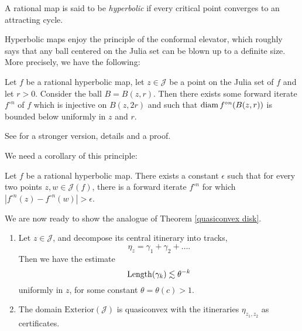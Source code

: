 A rational map is said to be \emph{hyperbolic} if every critical point converges to an attracting cycle.

Hyperbolic maps enjoy the principle of the conformal elevator, which roughly says that any ball centered on the Julia set can be blown up to a definite size. More precisely, we have the following:

\begin{proposition} \label{elevator}
	Let $f$ be a rational hyperbolic map, let $z\in \mathcal J$ be a point on the Julia set of $f$ and let $r>0$. Consider the ball $B=B(z,r)$. Then there exists some forward iterate $f^{\circ n}$ of $f$ which is injective on $B(z,2r)$ and such that
	$\operatorname{diam} {f^{\circ n}(B(z,r))}$ is bounded below uniformly in $z$ and $r$. 
\end{proposition}

See \cite{bonk_quasisymmetries_2016} for a stronger version, details and a proof.

We need a corollary of this principle:

\begin{corollary} \label{elevator for points on julia}
	Let $f$ be a rational hyperbolic map. There exists a constant $\epsilon$ such that for every two points $z,w\in\mathcal{J}(f)$, there is a forward iterate
$f^{\circ n}$ for which $\left|f^{\circ n}(z)-f^{\circ n}(w)\right|>\epsilon$.	
\end{corollary}

\begin{comment}
\begin{proof}
	Apply proposition \ref{elevator} to a ball centered on the Julia set which contains $z,w$ on its boundary at roughly antipodal points. After blowing up we get points $f^{\circ n}(z),f^{\circ n}(w)$ which are a definite distance apart by Koebe's distortion theorem. %
\end{proof}
\end{comment}

We are now ready to show the analogue of Theorem \ref{quasiconvex disk}.
\begin{theorem} 
\begin{enumerate}[label=(\roman*)]

\item Let $z\in\mathcal{J}$, and decompose its central itinerary into tracks, 
\begin{equation*}
\eta_z = \gamma _1 +\gamma_2 +\ldots.
\end{equation*}
Then we have the estimate
\begin{equation*}
\operatorname{Length}(\gamma_{k})\lesssim\theta^{-k}
\end{equation*}
uniformly in
$z$, for some constant $\theta=\theta(c)>1$.

\item The domain $\mathrm{Exterior}(\mathcal{J})$ is quasiconvex with the itineraries $\eta_{z_1,z_2}$ as certificates.
	\end{enumerate}
\end{theorem}

